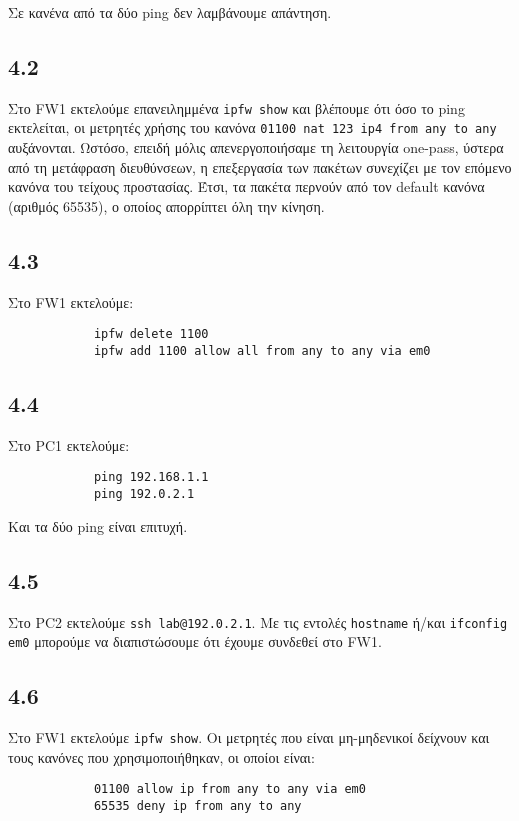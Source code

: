 \documentclass[a4paper, 12pt]{article}
\begin{document}
		Σε κανένα από τα δύο ping δεν λαμβάνουμε απάντηση.

	\subsection*{4.2}
		Στο FW1 εκτελούμε επανειλημμένα \verb|ipfw show| και βλέπουμε ότι όσο το ping εκτελείται, οι μετρητές χρήσης του κανόνα \verb|01100 nat 123 ip4 from any to any| αυξάνονται. Ωστόσο, επειδή μόλις απενεργοποιήσαμε τη λειτουργία one-pass, ύστερα από τη μετάφραση διευθύνσεων, η επεξεργασία των πακέτων συνεχίζει με τον επόμενο κανόνα του τείχους προστασίας. Έτσι, τα πακέτα περνούν από τον default κανόνα (αριθμός 65535), ο οποίος απορρίπτει όλη την κίνηση.

	\subsection*{4.3}
		Στο FW1 εκτελούμε:
		
		\begin{verbatim}
			ipfw delete 1100
			ipfw add 1100 allow all from any to any via em0
		\end{verbatim}

	\subsection*{4.4}
		Στο PC1 εκτελούμε:
		
		\begin{verbatim}
			ping 192.168.1.1
			ping 192.0.2.1
		\end{verbatim}
		
		Και τα δύο ping είναι επιτυχή.

	\subsection*{4.5}
		Στο PC2 εκτελούμε \verb|ssh lab@192.0.2.1|. Με τις εντολές \verb|hostname| ή/και \verb|ifconfig em0| μπορούμε να διαπιστώσουμε ότι έχουμε συνδεθεί στο FW1.

	\subsection*{4.6}
		Στο FW1 εκτελούμε \verb|ipfw show|. Οι μετρητές που είναι μη-μηδενικοί δείχνουν και τους κανόνες που χρησιμοποιήθηκαν, οι οποίοι είναι:
		
		\begin{verbatim}
			01100 allow ip from any to any via em0
			65535 deny ip from any to any
		\end{verbatim}
\end{document}
